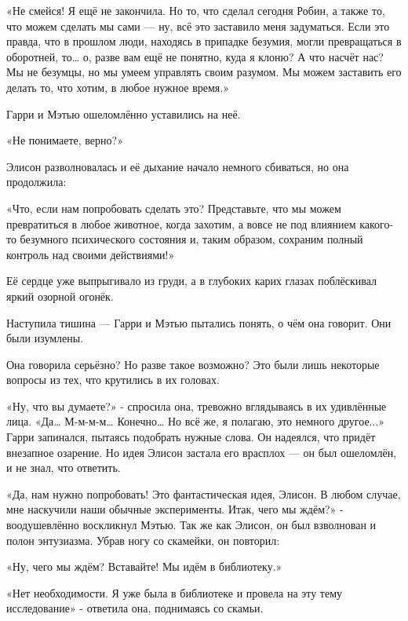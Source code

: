 \documentclass[a4paper,12pt]{book}
\begin{document}
\par
«Не смейся! Я ещё не закончила. Но то, что сделал сегодня Робин, а также то, что можем сделать мы сами — ну, всё это заставило меня задуматься. Если это правда, что в прошлом люди, находясь в припадке безумия, могли превращаться в оборотней, то… о, разве вам ещё не понятно, куда я клоню? А что насчёт нас? Мы не безумцы, но мы умеем управлять своим разумом. Мы можем заставить его делать то, что хотим, в любое нужное время.»
\par
Гарри и Мэтью ошеломлённо уставились на неё.
\par
«Не понимаете, верно?»
\par
Элисон разволновалась и её дыхание начало немного сбиваться, но она продолжила:
\par
«Что, если нам попробовать сделать это? Представьте, что мы можем превратиться в любое животное, когда захотим, а вовсе не под влиянием какого-то безумного психического состояния и, таким образом, сохраним полный контроль над своими действиями!»\\
\par
Её сердце уже выпрыгивало из груди, а в глубоких карих глазах поблёскивал яркий озорной огонёк.
\par
Наступила тишина — Гарри и Мэтью пытались понять, о чём она говорит. Они были изумлены.
\par
Она говорила серьёзно? Но разве такое возможно? Это были лишь некоторые вопросы из тех, что крутились в их головах.
\par
«Ну, что вы думаете?» - спросила она, тревожно вглядываясь в их удивлённые лица.
\newline\hspace*{0.4cm}
«Да… М-м-м-м… Конечно… Но всё же, я полагаю, это немного другое...»
\newline\hspace*{0.4cm}
Гарри запинался, пытаясь подобрать нужные слова. Он надеялся, что придёт внезапное озарение. Но идея Элисон застала его врасплох — он был ошеломлён, и не знал, что ответить.
\par
«Да, нам нужно попробовать! Это фантастическая идея, Элисон. В любом случае, мне наскучили наши обычные эксперименты. Итак, чего мы ждём?» - воодушевлённо воскликнул Мэтью. Так же как Элисон, он был взволнован и полон энтузиазма. Убрав ногу со скамейки, он повторил:
\par
«Ну, чего мы ждём? Вставайте! Мы идём в библиотеку.»
\par
«Нет необходимости. Я уже была в библиотеке и провела на эту тему исследование» - ответила она, поднимаясь со скамьи.
\end{document}
